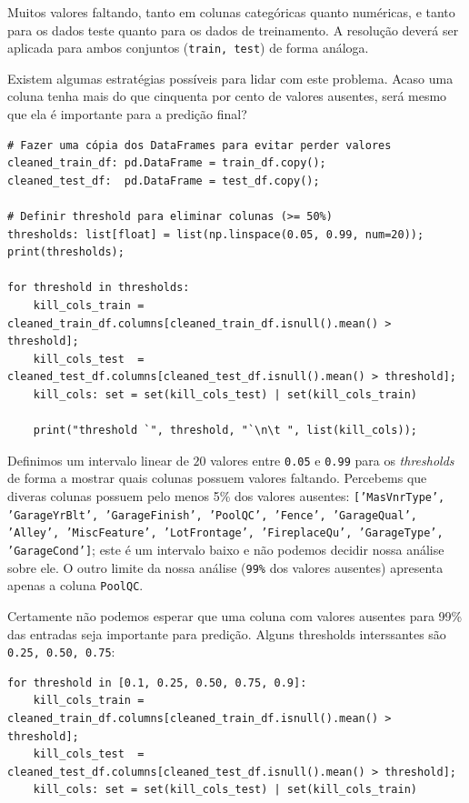 \documentclass[11pt]{article}
\begin{document}
\begin{enumerate}
Muitos valores faltando, tanto em colunas categóricas quanto numéricas, e tanto para os dados teste quanto para os dados de treinamento. A resolução deverá ser aplicada para ambos conjuntos (\texttt{train, test}) de forma análoga.

Existem algumas estratégias possíveis para lidar com este problema. Acaso uma coluna tenha mais do que cinquenta por cento de valores ausentes, será mesmo que ela é importante para a predição final?

\begin{verbatim}
# Fazer uma cópia dos DataFrames para evitar perder valores
cleaned_train_df: pd.DataFrame = train_df.copy();
cleaned_test_df:  pd.DataFrame = test_df.copy();

# Definir threshold para eliminar colunas (>= 50%)
thresholds: list[float] = list(np.linspace(0.05, 0.99, num=20));
print(thresholds);

for threshold in thresholds:
    kill_cols_train = cleaned_train_df.columns[cleaned_train_df.isnull().mean() > threshold];
    kill_cols_test  = cleaned_test_df.columns[cleaned_test_df.isnull().mean() > threshold];
    kill_cols: set = set(kill_cols_test) | set(kill_cols_train)

    print("threshold `", threshold, "`\n\t ", list(kill_cols));

\end{verbatim}

Definimos um intervalo linear de \(20\) valores entre \texttt{0.05} e \texttt{0.99} para os \emph{thresholds} de forma a mostrar quais colunas possuem valores faltando. Percebems que diveras colunas possuem pelo menos 5\% dos valores ausentes: \texttt{['MasVnrType', 'GarageYrBlt', 'GarageFinish', 'PoolQC', 'Fence', 'GarageQual', 'Alley', 'MiscFeature', 'LotFrontage', 'FireplaceQu', 'GarageType', 'GarageCond']}; este é um intervalo baixo e não podemos decidir nossa análise sobre ele. O outro limite da nossa análise (\texttt{99\%} dos valores ausentes) apresenta apenas a coluna \texttt{PoolQC}.

Certamente não podemos esperar que uma coluna com valores ausentes para 99\% das entradas seja importante para predição. Alguns thresholds interssantes são \texttt{0.25, 0.50, 0.75}:

\begin{verbatim}
for threshold in [0.1, 0.25, 0.50, 0.75, 0.9]:
    kill_cols_train = cleaned_train_df.columns[cleaned_train_df.isnull().mean() > threshold];
    kill_cols_test  = cleaned_test_df.columns[cleaned_test_df.isnull().mean() > threshold];
    kill_cols: set = set(kill_cols_test) | set(kill_cols_train)


\end{verbatim}
\end{enumerate}
\end{document}
